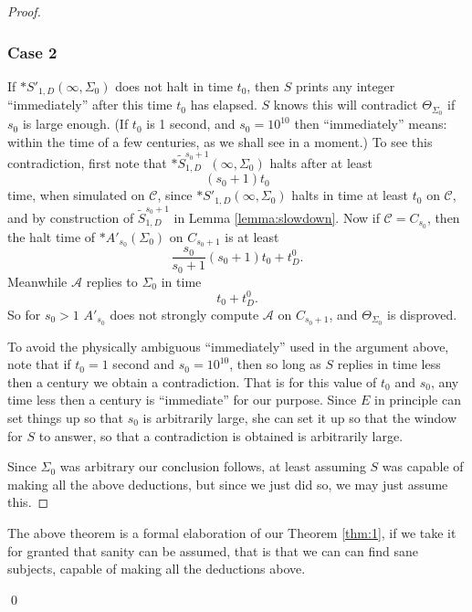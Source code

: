 \documentclass[9pt,twocolumn,twoside,lineno]{pnas-new}
\numberwithin{equation}{section}
\theoremstyle{definition}
\theoremstyle{remark}
\begin{document}
\begin{proof}
\subsubsection* {Case 2}
If $*S' _{1,D} (\infty, \Sigma _{0} )$ does not halt in time $t _{0} $, then $S$ prints any integer ``immediately'' after this time $t _{0} $ has elapsed.  $S$ knows this will contradict $\Theta _{\Sigma _{0} } $ if $s _{0} $ is large enough.
(If $t _{0}$ is 1 second, and $s _{0} =10 ^{10} $ then ``immediately'' means: within the time of a few centuries, as we shall see in a moment.) 
   To see this contradiction, first note that $* \widetilde{S}  _{1,D} ^{s_0+1}  (\infty, \Sigma _{0} )$ halts after at least $$(s _{0} +1) t _{0}  $$ time, when simulated on $\mathcal{C}$, since $*S'   _{1,D} (\infty, \Sigma _{0} )$ halts in time at least $t _{0} $ on $\mathcal{C}$, and by construction of  
 $\widetilde{S} ^{s _{0} +1} _{1,D}$ in Lemma \ref{lemma:slowdown}.
   Now if $\mathcal{C}=C _{s _{0} } $, then the halt time of $*A' _{s _{0} } (\Sigma _{0} ) $ on $C _{s _{0} +1} $ is at least  $$ \frac{s _{0} }{s _{0} +1 }(s _{0}  +1) t _{0} + t ^{0} _{D}. $$  Meanwhile $\mathcal{A} $ replies to $\Sigma _{0} $ in time \begin{equation*} t _{0} + t _{D}  ^{0}.  \end{equation*} 
So for $s _{0} >1$ $A' _{s _{0} } $ does not strongly compute $\mathcal{A}$ on $C _{s _{0} +1} $, and $\Theta _{\Sigma _{0} } $ is disproved.
     
   To avoid the physically ambiguous ``immediately'' used in the argument above, note that if $t_0 = 1$ second and $s _{0} =10 ^{10} $, then so long as $S$ replies in time less then a century we obtain a contradiction. That is for this value of $t _{0} $ and $s _{0} $, any time less then a century is ``immediate'' for our purpose.
   Since $E$ in principle can set things up so that $s _{0} $ is arbitrarily large, she can set it up so that the window for $S$ to answer, so that a contradiction is obtained is arbitrarily large.  
   
   Since $\Sigma _{0} $ was arbitrary our conclusion follows, at least assuming $S$ was capable of making all the above deductions, but since we just did so, we may just assume this.
\end{proof}
The above theorem is a formal elaboration of our Theorem \ref{thm:1}, if we take it for granted that sanity can be assumed, that is that we can can find sane subjects, capable of making all the deductions above.

\qed
 
\end{document}
